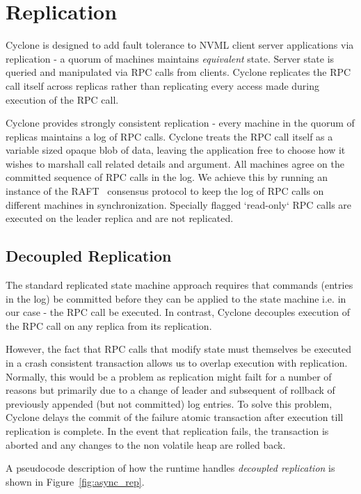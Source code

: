 \documentclass[letterpaper,twocolumn,10pt]{article}
\begin{document}
\section{Replication}
Cyclone is designed to add fault tolerance to NVML client server applications
via replication - a quorum of machines maintains \emph{equivalent} state. Server
state is queried and manipulated via RPC calls from clients. Cyclone replicates
the RPC call itself across replicas rather than replicating every access made
during execution of the RPC call.

Cyclone provides strongly consistent replication - every machine in the quorum
of replicas maintains a log of RPC calls. Cyclone treats the RPC call itself as
a variable sized opaque blob of data, leaving the application free to choose how
it wishes to marshall call related details and argument. All machines agree on
the committed sequence of RPC calls in the log. We achieve this by running an
instance of the RAFT~\cite{raft} consensus protocol to keep the log of RPC calls on
different machines in synchronization. Specially flagged `read-only` RPC calls
are executed on the leader replica and are not replicated.

\subsection{Decoupled Replication}
\label{sec:decouple}
The standard replicated state machine approach requires that commands (entries
in the log) be committed before they can be applied to the state machine i.e. in
our case - the RPC call be executed. In contrast, Cyclone decouples execution of
the RPC call on any replica from its replication.

However, the fact that RPC calls that modify state must themselves be executed
in a crash consistent transaction allows us to overlap execution with
replication. Normally, this would be a problem as replication might failt for a
number of reasons but primarily due to a change of leader and subsequent of
rollback of previously appended (but not committed) log entries. To solve this
problem, Cyclone delays the commit of the failure atomic transaction after
execution till replication is complete. In the event that replication fails, the
transaction is aborted and any changes to the non volatile heap are rolled back.

A pseudocode description of how the runtime handles \emph{decoupled replication}
is shown in Figure~\ref{fig:async_rep}.
\end{document}

